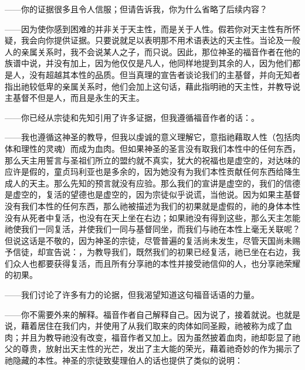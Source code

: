 ——你的证据很多且令人信服；但请告诉我，你为什么省略了后续内容？\par

——因为使你感到困难的并非关于天主性，而是关于人性。假若你对天主性有所怀疑，我会向你提供证据。只要说就足以表明那不用术语表达的天主性。当论及一般人的亲属关系时，我不会说某人之子，而只说。因此，那位神圣的福音作者在他的族谱中说，并没有加上，因为他仅仅是凡人，他同样地提到其余的人，因为他们都是人，没有超越其本性的品质。但当真理的宣告者谈论我们的主基督，并向无知者指出祂较低卑的亲属关系时，他们会加上这句话，藉此指明祂的天主性，并教导说主基督不但是人，而且是永生的天主。\par

——你已经从宗徒和先知引用了许多证据，但我遵循福音作者的话：。\par

——我也遵循这神圣的教导，但我以虔诚的意义理解它，意指祂藉取人性（包括肉体和理性的灵魂）而成为血肉。但如果神圣的圣言没有取我们本性中的任何东西，那么天主用誓言与圣祖们所立的盟约就不真实，犹大的祝福也是虚空的，对达味的应许是假的，童贞玛利亚也是多余的，因为她没有为我们本性贡献任何东西给降生成人的天主。那么先知的预言就没有应验。那么我们的宣讲是虚空的，我们的信德是虚空的，复活的望德也是虚空的，因为宗徒似乎说谎，当他说。因为如果主基督没有我们本性的任何东西，那么祂被描述为我们的初果就是虚假的，祂的身体本性没有从死者中复活，也没有在天上坐在右边；如果祂没有得到这些，那么天主怎能祂使我们一同复活，并使我们一同与基督同坐，而我们与祂在本性上毫无关联呢？但说这话是不敬的，因为神圣的宗徒，尽管普遍的复活尚未发生，尽管天国尚未赐予信徒，却宣告说：，为教导我们，既然我们的初果已经复活，祂已坐在右边，我们众人也都要获得复活，而且所有分享祂的本性并接受祂信仰的人，也分享祂荣耀的初果。\par

——我们讨论了许多有力的论据，但我渴望知道这句福音话语的力量。\par

——你不需要外来的解释。福音作者自己解释自己。因为说了，接着就说。也就是说，藉着居住在我们内，并使用了从我们取来的肉体如同圣殿，祂被称为成了血肉；并且为教导祂没有改变，福音作者又加上。因为虽然披着血肉，祂却彰显了祂父的尊贵，放射出天主性的光芒，发出了主大能的荣光，藉着祂奇妙的作为揭示了祂隐藏的本性。神圣的宗徒致斐理伯人的话也提供了类似的说明：\par

